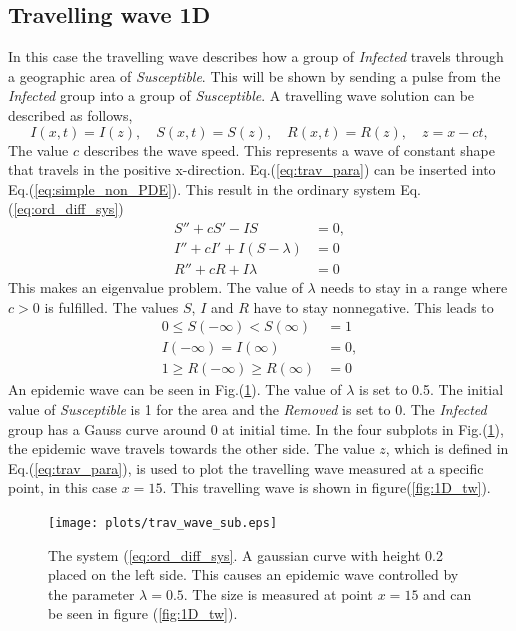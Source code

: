 \documentclass[%
twoside,                 %
final,                   %
10pt]{article}
\begin{document}
\subsection{Travelling wave 1D}
In this case the travelling wave describes how a group of \emph{Infected} travels through a geographic area of \emph{Susceptible}. This will be shown by sending a pulse from the \emph{Infected} group into a group of \emph{Susceptible}. A travelling wave solution can be described as follows,
\begin{equation} \label{eq:trav_para}
I(x,t)=I(z),\quad S(x,t)=S(z),\quad R(x,t) = R(z),\quad z = x-ct,
\end{equation}
The value $c$ describes the wave speed. This represents a wave of constant shape that travels in the positive x-direction. Eq.(\ref{eq:trav_para}) can be inserted into Eq.(\ref{eq:simple_non_PDE}). This result in the ordinary system Eq.(\ref{eq:ord_diff_sys})
\begin{equation} \label{eq:ord_diff_sys}
	\begin{aligned}
	S'' + cS' - IS &= 0,\\
	I'' + cI' + I(S-\lambda)&=0\\
	R'' + cR  + I\lambda &=0
	\end{aligned}
\end{equation}
This makes an eigenvalue problem. The value of $\lambda$ needs to stay in a range where $c > 0$ is fulfilled. The values $S$, $I$ and $R$ have to stay nonnegative. This leads to
\begin{equation} 
	\begin{aligned}
	0 \leq S(-\infty) < S(\infty)&=1\\
	I(-\infty)=I(\infty)&=0,\\
	1 \geq R(-\infty)\geq R(\infty) &= 0
	\end{aligned}
\end{equation}
An epidemic wave can be seen in Fig.(\ref{fig:1D_sub}). The value of $\lambda$ is set to 0.5. The initial value of \emph{Susceptible} is 1 for the area and the \emph{Removed} is set to 0. The \emph{Infected} group has a Gauss curve around 0 at initial time. In the four subplots in Fig.(\ref{fig:1D_sub}), the epidemic wave travels towards the other side. The value $z$, which is defined in Eq.(\ref{eq:trav_para}), is used to plot the travelling wave measured at a specific point, in this case $x=15$. This travelling wave is shown in figure(\ref{fig:1D_tw}).       


\begin{figure}[ht]
  \centerline{\texttt{[image: plots/trav\_wave\_sub.eps]}}
  \caption{
  \label{fig:1D_sub} The system (\ref{eq:ord_diff_sys}. A gaussian curve with height 0.2 placed on the left side. This causes an epidemic wave controlled by the parameter $\lambda=0.5$. The size is measured at point $x=15$ and can be seen in figure (\ref{fig:1D_tw}).
  }
\end{figure}
\end{document}
